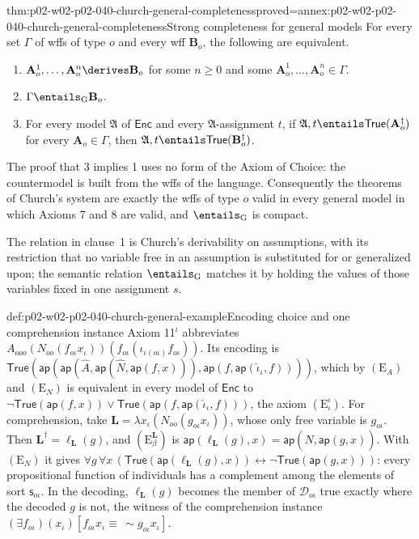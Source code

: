 \begin{hbtheorem}{thm:p02-w02-p02-040-church-general-completeness}{proved=annex:p02-w02-p02-040-church-general-completeness}{Strong completeness for general models}
For every set \(\Gamma\) of wffs of type \(o\) and every wff \(\mathbf B_o\),
the following are equivalent.
\begin{enumerate}
 \item \(\mathbf A^1_o,\ldots,\mathbf A^n_o\derives\mathbf B_o\) for some
   \(n\geq0\) and some \(\mathbf A^1_o,\ldots,\mathbf A^n_o\in\Gamma\).
 \item \(\Gamma\entails_{\mathrm G}\mathbf B_o\).
 \item For every model \(\mathfrak A\) of \(\mathsf{Enc}\) and every
   \(\mathfrak A\)-assignment \(t\), if
   \(\mathfrak A,t\entails\mathsf{True}(\mathbf A_o^\dagger)\) for every
   \(\mathbf A_o\in\Gamma\), then
   \(\mathfrak A,t\entails\mathsf{True}(\mathbf B_o^\dagger)\).
\end{enumerate}
The proof that 3 implies 1 uses no form of the Axiom of Choice: the
countermodel is built from the wffs of the language.  Consequently the
theorems of Church's system are exactly the wffs of type \(o\) valid in every
general model in which Axioms 7 and 8 are valid, and \(\entails_{\mathrm G}\)
is compact.
\end{hbtheorem}

The relation in clause~1 is Church's derivability on assumptions, with its
restriction that no variable free in an assumption is substituted for or
generalized upon; the semantic relation \(\entails_{\mathrm G}\) matches it by
holding the values of those variables fixed in one assignment \(s\).

\begin{hbexample}{def:p02-w02-p02-040-church-general-example}{Encoding choice and one comprehension instance}
Axiom 11\(^\iota\) abbreviates
\(A_{ooo}(N_{oo}(f_{o\iota}x_\iota))(f_{o\iota}(\iota_{\iota(o\iota)}f_{o\iota}))\).
Its encoding is
\(\mathsf{True}(\mathsf{ap}(\mathsf{ap}(\widehat A,\mathsf{ap}(\widehat N,\mathsf{ap}(f,x))),\mathsf{ap}(f,\mathsf{ap}(\widehat\iota_\iota,f))))\),
which by \((\mathrm E_A)\) and \((\mathrm E_N)\) is equivalent in every model of
\(\mathsf{Enc}\) to
\(\neg\mathsf{True}(\mathsf{ap}(f,x))\lor\mathsf{True}(\mathsf{ap}(f,\mathsf{ap}(\widehat\iota_\iota,f)))\),
the axiom \((\mathrm E_\iota^\iota)\).  For comprehension, take
\(\mathbf L=\lambda x_\iota(N_{oo}(g_{o\iota}x_\iota))\), whose only free
variable is \(g_{o\iota}\).  Then \(\mathbf L^\dagger=\ell_{\mathbf L}(g)\), and
\((\mathrm E_\beta^{\mathbf L})\) is
\(\mathsf{ap}(\ell_{\mathbf L}(g),x)=\mathsf{ap}(\widehat N,\mathsf{ap}(g,x))\).
With \((\mathrm E_N)\) it gives
\(\forall g\,\forall x\,(\mathsf{True}(\mathsf{ap}(\ell_{\mathbf L}(g),x))\leftrightarrow\neg\mathsf{True}(\mathsf{ap}(g,x)))\):
every propositional function of individuals has a complement among the
elements of sort \(\mathsf s_{o\iota}\).  In the decoding, \(\ell_{\mathbf L}(g)\)
becomes the member of \(\mathcal D_{o\iota}\) true exactly where the decoded
\(g\) is not, the witness of the comprehension instance
\((\exists f_{o\iota})(x_\iota)[f_{o\iota}x_\iota\equiv\,\sim g_{o\iota}x_\iota]\).
\end{hbexample}

